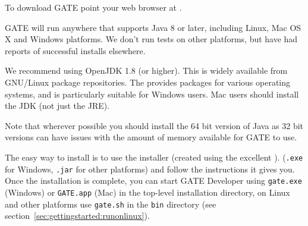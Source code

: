 



To download GATE point your web browser at
.


%
GATE will run anywhere that supports Java 8 or later, including Linux,
Mac OS X and Windows platforms. We don't run tests on other platforms, but have
had reports of successful installs elsewhere.

We recommend using OpenJDK 1.8 (or higher).  This is widely available from
GNU/Linux package repositories.  The
 provides packages for
various operating systems, and is particularly suitable for Windows users.  Mac
users should install the JDK (not just the JRE).

Note that wherever possible you should install the 64 bit version of Java as
32 bit versions can have issues with the amount of memory available for GATE
to use.
%

The easy way to install is to use the installer
(created using the excellent ).
 (\verb!.exe! for
Windows, \verb!.jar! for other platforms) and follow the instructions it gives
you. Once the installation is complete, you can start GATE Developer using
\verb|gate.exe| (Windows) or \verb|GATE.app| (Mac) in the top-level
installation directory, on Linux and other platforms use \verb|gate.sh| 
in the \texttt{bin} directory (see section~\ref{sec:gettingstarted:runonlinux}).

